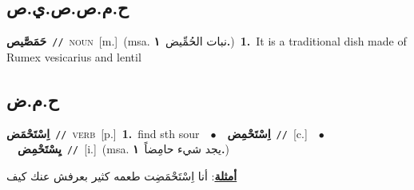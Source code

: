 \documentclass[10pt,a4paper,twoside]{article} %
\begin{document}
\begin{multicols}{2}
\vspace{-3mm}
\subsection*{\color{blue}\foreignlanguage{arabic}{ح.م.ص.ص.ي.ص}\color{blue}{ (ntws)}} 

{\setlength\topsep{0pt}\textbf{\foreignlanguage{arabic}{حَمَصَّيص}}\ {\color{gray}\texttt{//}\color{black}}\ \textsc{noun}\ [m.]\ \color{gray}(msa. \foreignlanguage{arabic}{نبات الحُمِّيض}~\foreignlanguage{arabic}{\textbf{١.}})\color{black}\ \textbf{1.}~It is a traditional dish made of Rumex vesicarius and lentil\ } \vspace{2mm}

\vspace{-3mm}
\subsection*{\color{blue}\foreignlanguage{arabic}{ح.م.ض}\color{blue}{}} 

{\setlength\topsep{0pt}\textbf{\foreignlanguage{arabic}{اِسْتَحْمَض}}\ {\color{gray}\texttt{//}\color{black}}\ \textsc{verb}\ [p.]\ \textbf{1.}~find sth sour\ \ $\bullet$\ \ \setlength\topsep{0pt}\textbf{\foreignlanguage{arabic}{اِسْتَحْمِض}}\ {\color{gray}\texttt{//}\color{black}}\ [c.]\ \ $\bullet$\ \ \setlength\topsep{0pt}\textbf{\foreignlanguage{arabic}{يِسْتَحْمِض}}\ {\color{gray}\texttt{//}\color{black}}\ [i.]\ \color{gray}(msa. \foreignlanguage{arabic}{يجد شيء حامِضاً}~\foreignlanguage{arabic}{\textbf{١.}})\color{black}\  \begin{flushright}\color{gray}\foreignlanguage{arabic}{\textbf{\underline{\foreignlanguage{arabic}{أمثلة}}}: أنا اِسْتَحْمَضِت طعمه كثير بعرفش عنك كيف}\end{flushright}\color{black}} \vspace{2mm}


\end{multicols}
\end{document}

